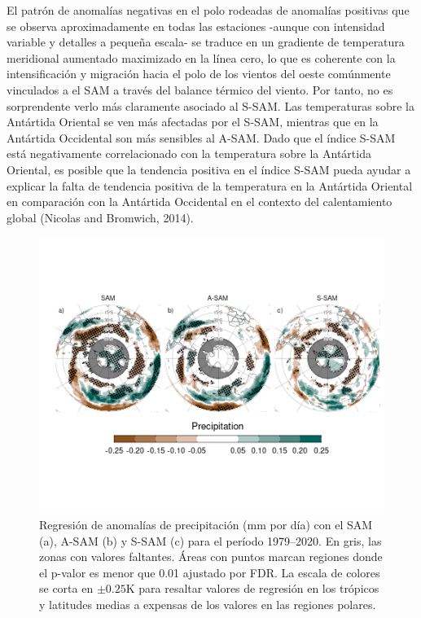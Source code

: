 \documentclass[12pt,oneside]{reedthesis}
\begin{document}
El patrón de anomalías negativas en el polo rodeadas de anomalías positivas que se observa aproximadamente en todas las estaciones -aunque con intensidad variable y detalles a pequeña escala- se traduce en un gradiente de temperatura meridional aumentado maximizado en la línea cero, lo que es coherente con la intensificación y migración hacia el polo de los vientos del oeste comúnmente vinculados a el SAM a través del balance térmico del viento.
Por tanto, no es sorprendente verlo más claramente asociado al S-SAM.
Las temperaturas sobre la Antártida Oriental se ven más afectadas por el S-SAM, mientras que en la Antártida Occidental son más sensibles al A-SAM.
Dado que el índice S-SAM está negativamente correlacionado con la temperatura sobre la Antártida Oriental, es posible que la tendencia positiva en el índice S-SAM pueda ayudar a explicar la falta de tendencia positiva de la temperatura en la Antártida Oriental en comparación con la Antártida Occidental en el contexto del calentamiento global (Nicolas and Bromwich, 2014).



\begin{figure}
\includegraphics{figures/30-sam/global-pp-1} \caption{Regresión de anomalías de precipitación (mm por día) con el SAM (a), A-SAM (b) y S-SAM (c) para el período 1979--2020. En gris, las zonas con valores faltantes. Áreas con puntos marcan regiones donde el p-valor es menor que 0.01 ajustado por FDR. La escala de colores se corta en \(\pm0.25 \mathrm{K}\) para resaltar valores de regresión en los trópicos y latitudes medias a expensas de los valores en las regiones polares.}\label{fig:global-pp}
\end{figure}
\end{document}

